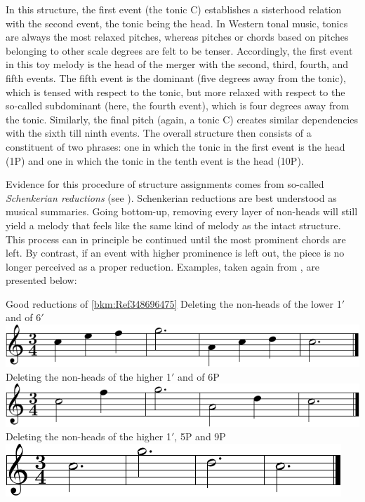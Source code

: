 \documentclass[output=paper]{langsci/langscibook}
\begin{document}
In this structure, the first event (the tonic C) establishes a sisterhood
relation with the second event, the tonic being the head. In Western tonal
music, tonics are always the most relaxed pitches, whereas pitches or chords
based on pitches belonging to other scale degrees are felt to be tenser.
Accordingly, the first event in this toy melody is the head of the merger with
the second, third, fourth, and fifth events. The fifth event is the dominant
(five degrees away from the tonic), which is tensed with respect to the tonic,
but more relaxed with respect to the so-called subdominant (here, the fourth
event), which is four degrees away from the tonic. Similarly, the final pitch
(again, a tonic C) creates similar dependencies with the sixth till ninth
events. The overall structure then consists of a constituent of two phrases:
one in which the tonic in the first event is the head (1P) and one in which the
tonic in the tenth event is the head (10P).

Evidence for this procedure of structure assignments comes from so-called
\emph{Schenkerian reductions} (see \citealt{Forte1959}). Schenkerian reductions
are best understood as musical summaries. Going bottom-up, removing every layer
of non-heads will still yield a melody that feels like the same kind of melody
as the intact structure. This process can in principle be continued until the
most prominent chords are left. By contrast, if an event with higher prominence
is left out, the piece is no longer perceived as a proper reduction. Examples,
taken again from \citet{KatzPes2011}, are presented below:

\ea\label{ex:key:26.8}Good reductions of \eqref{bkm:Ref348696475}
    \ea Deleting the non-heads of the lower 1$'$ and of 6$'$
        \includegraphics[scale=.9]{./img/28-8a.pdf}
    \ex Deleting the non-heads of the higher 1$'$ and of 6P
        \includegraphics[scale=.9]{./img/28-8b.pdf}
    \ex Deleting the non-heads of the higher 1$'$, 5P and 9P
        \includegraphics[scale=.9]{./img/28-8c.pdf}
    \z
\z
\end{document}
